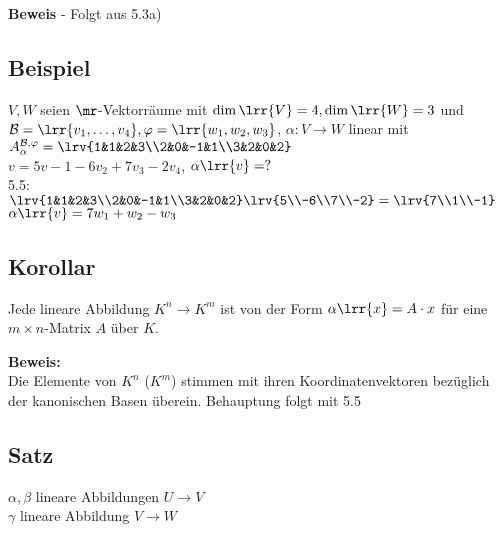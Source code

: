 
	\textbf{Beweis} - Folgt aus 5.3a)

\subsection{Beispiel}
	$V,W$ seien $\mr$-Vektorräume mit $\dim\lrr{V}=4, \dim\lrr{W}=3$ und $\mathcal{B}=\lrr{v_1,\dots,v_4},\varphi=\lrr{w_1,w_2,w_3}$, $\alpha:V\rightarrow W$ linear mit \\
	$A_\alpha^{\mathcal{B},\varphi}=\lrv{1&1&2&3\\2&0&-1&1\\3&2&0&2}$\\
	$v=5v-1-6v_2+7v_3-2v_4$, $\alpha\lrr{v}=?$\\
	5.5:$\lrv{1&1&2&3\\2&0&-1&1\\3&2&0&2}\lrv{5\\-6\\7\\-2}=\lrv{7\\1\\-1}$\\
	$\alpha\lrr{v}=7w_1+w_2-w_3$
	
\subsection{Korollar}
	Jede lineare Abbildung $K^n\rightarrow K^m$ ist von der Form $\alpha\lrr{x}=A\cdot x$ für eine $m\times n$-Matrix $A$ über $K$.

	\textbf{Beweis:}\\
	Die Elemente von $K^n$ ($K^m$) stimmen mit ihren Koordinatenvektoren bezüglich der kanonischen Basen überein. Behauptung folgt mit 5.5

\subsection{Satz}
	$\alpha,\beta$ lineare Abbildungen $U\rightarrow V$\\
	$\gamma$ lineare Abbildung $V\rightarrow W$

